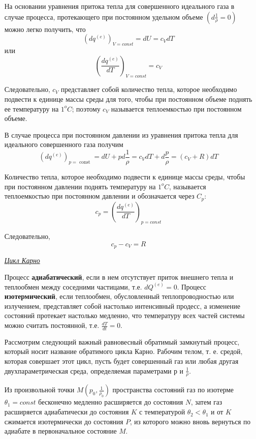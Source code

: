 На основании уравнения притока тепла для совершенного идеального газа в случае процесса, протекающего при постоянном удельном объеме $\left(\displaystyle d\frac{1}{\rho}=0\right)$ можно легко получить, что
$$ (dq^{(e)})_{V = const} = dU = c_VdT $$
или
$$ \left( \frac{dq^{(e)}}{dT} \right)_{V=const} = c_V $$

Следовательно,  $c_V$ представляет собой количество тепла, которое необходимо подвести к единице массы среды для того, чтобы при постоянном объеме поднять ее температуру на $1^oC$;  поэтому $c_V$ называется теплоемкостью при постоянном объеме.

В случае процесса при постоянном давлении из уравнения притока тепла для идеального совершенного газа получим
$$ \left(d q^{(e)}\right)_{p=\text { const }}=d U+p d \frac{1}{\rho}=c_V d T+d \frac{p}{\rho}=\left(c_V+R\right) d T $$

Количество тепла, которое необходимо подвести к единице массы среды, чтобы при постоянном давлении поднять температуру на $1^oC$, называется теплоемкостью при постоянном давлении и обозначается через $C_p$:
$$ c_p = \left( \frac{dq^{(e)}}{dT} \right)_{p=const} $$

Следовательно, $$ c_p - c_V = R $$


\begin{center}
	\textit{\underline{Цикл Карно}}
\end{center}

Процесс \textbf{адиабатический}, если в нем отсутствует приток внешнего тепла и теплообмен между соседними частицами, т.е. $\displaystyle dQ^{(e)} = 0$.
Процесс \textbf{изотермический}, если теплообмен, обусловленный теплопроводностью или излучением, представляет собой настолько интенсивный продесс, а изменение состояний протекает настолько медленно, что температуру всех частей системы можно считать постоянной, т.е. $\displaystyle \frac{dT}{dt} = 0$.

Рассмотрим следующий важный равновесный обратимый замкнутый процесс, который носит название обратимого цикла Карно. Рабочим телом, т. е. средой, которая совершает этот цикл, пусть будет совершенный газ или любая другая двухпараметрическая среда, определяемая параметрами р и $\frac{1}{\rho}$. 

Из произвольной точки $M (p_0, \frac{1}{\rho_0})$ пространства состояний газ по изотерме $\theta_1 = const$ бесконечно медленно расширяется до состояния $N$, затем газ расширяется адиабатически до состояния $K$ с  температурой $\theta_2 < \theta_1$ и от $K$ сжимается изотермически до состояния $P$, из которого можно вновь вернуться по адиабате в первоначальное состояние $M$.

